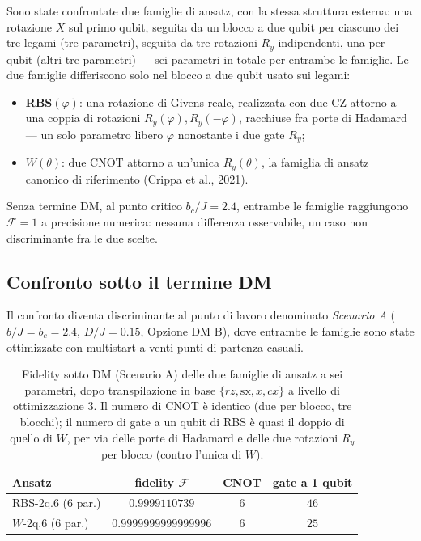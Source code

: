 \documentclass[11pt,a4paper]{article}
\begin{document}
Sono state confrontate due famiglie di ansatz, con la stessa struttura
esterna: una rotazione $X$ sul primo qubit, seguita da un blocco a due
qubit per ciascuno dei tre legami (tre parametri), seguita da tre
rotazioni $R_y$ indipendenti, una per qubit (altri tre parametri) --- sei
parametri in totale per entrambe le famiglie. Le due famiglie differiscono
solo nel blocco a due qubit usato sui legami:
\begin{itemize}[leftmargin=1.6em,itemsep=2pt]
\item \textbf{RBS}$(\varphi)$: una rotazione di Givens reale, realizzata
con due CZ attorno a una coppia di rotazioni $R_y(\varphi),R_y(-\varphi)$,
racchiuse fra porte di Hadamard --- un solo parametro libero $\varphi$
nonostante i due gate $R_y$;
\item \textbf{$W(\theta)$}: due CNOT attorno a un'unica $R_y(\theta)$, la
famiglia di ansatz canonico di riferimento (Crippa et al., 2021).
\end{itemize}

Senza termine DM, al punto critico $b_c/J=2.4$, entrambe le famiglie
raggiungono $\mathcal F=1$ a precisione numerica: nessuna differenza
osservabile, un caso non discriminante fra le due scelte.

\subsection{Confronto sotto il termine DM}
\label{sec:rbs-vs-w}

Il confronto diventa discriminante al punto di lavoro denominato
\emph{Scenario A} ($b/J=b_c=2.4$, $D/J=0.15$, Opzione DM B), dove entrambe
le famiglie sono state ottimizzate con multistart a venti punti di
partenza casuali.

\begin{table}[htbp]
\centering
\small
\renewcommand{\arraystretch}{1.3}
\begin{tabular}{@{}lccc@{}}
\toprule
\rowcolor{grigetto}
\textbf{Ansatz} & \textbf{fidelity} $\mathcal F$ & \textbf{CNOT} & \textbf{gate a 1 qubit} \\
\midrule
RBS-2q.6 (6 par.) & $0.9999110739$ & $6$ & $46$ \\
$W$-2q.6 (6 par.) & $0.9999999999999996$ & $6$ & $25$ \\
\bottomrule
\end{tabular}
\caption{Fidelity sotto DM (Scenario A) delle due famiglie di ansatz a
sei parametri, dopo transpilazione in base $\{rz,\mathrm{sx},x,cx\}$ a
livello di ottimizzazione 3. Il numero di CNOT è identico (due per
blocco, tre blocchi); il numero di gate a un qubit di RBS è quasi il
doppio di quello di $W$, per via delle porte di Hadamard e delle due
rotazioni $R_y$ per blocco (contro l'unica di $W$).}
\label{tab:rbs-vs-w}
\end{table}
\FloatBarrier
\end{document}
